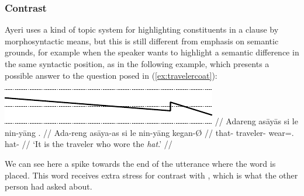 \subsubsection{Contrast}

Ayeri uses a kind of topic system for highlighting constituents in 
a clause by morphosyntactic means, but this is still different from emphasis on 
semantic grounds, for example when the speaker wants to highlight a 
semantic difference in the same syntactic position, as in the following example, 
which presents a possible answer to the question posed in 
(\ref{ex:travelercoat}):

\ex\begingl
	\glpreamble \raisebox{-1.5em}
		{\includegraphics{images/contours-contrast.pdf}} //
	\gla Adareng asāyās si le nin-yāng . //
	\glb Ada-reng asāya-as si le nin-yāng kegan-Ø //
	\glc that-\AargI{} traveler-\Parg{} \Rel{} \PatTI{} wear=\TsgM{}.\Aarg{} 
		hat-\Top{} //
	\glft `It is the traveler who wore the \emph{hat}.' //
\endgl\xe

We can see here a spike towards the end of the utterance where the word 
 is placed. This word receives extra stress for 
contrast with , which is what the other person had asked 
about.
